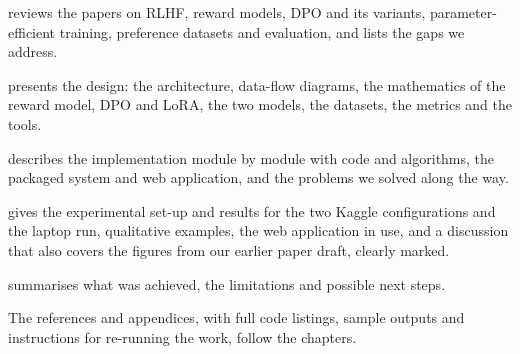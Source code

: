 \begin{description}[style=nextline, leftmargin=2.2cm, font=\normalfont\bfseries]
  \item[Chapter 2] reviews the papers on RLHF, reward models, DPO and its variants, parameter-efficient training, preference datasets and evaluation, and lists the gaps we address.
  \item[Chapter 3] presents the design: the architecture, data-flow diagrams, the mathematics of the reward model, DPO and LoRA, the two models, the datasets, the metrics and the tools.
  \item[Chapter 4] describes the implementation module by module with code and algorithms, the packaged system and web application, and the problems we solved along the way.
  \item[Chapter 5] gives the experimental set-up and results for the two Kaggle configurations and the laptop run, qualitative examples, the web application in use, and a discussion that also covers the figures from our earlier paper draft, clearly marked.
  \item[Chapter 6] summarises what was achieved, the limitations and possible next steps.
\end{description}
The references and appendices, with full code listings, sample outputs and instructions for re-running the work, follow the chapters.
